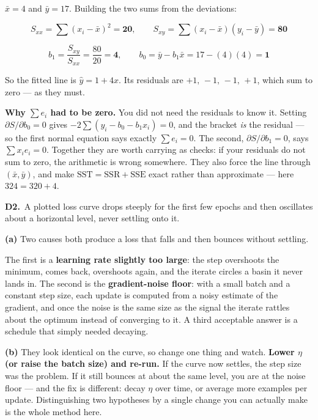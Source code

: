 \documentclass[10pt,a4paper]{article}
\newcommand{\sol}[1]{\textbf{#1}}
\begin{document}
\vspace{2pt}

$\bar x = 4$ and $\bar y = 17$. Building the two sums from the deviations:

\[ S_{xx} = \sum (x_i-\bar x)^2 = \sol{20}, \qquad S_{xy} = \sum (x_i-\bar x)(y_i-\bar y) = \sol{80} \]

\[ b_1 = \frac{S_{xy}}{S_{xx}} = \frac{80}{20} = \sol{4}, \qquad b_0 = \bar y - b_1\bar x = 17 - (4)(4) = \sol{1} \]

So the fitted line is $\hat y = 1 + 4 x$. Its residuals are $+1,\,-1,\,-1,\,+1$, which sum to zero --- as they must.

\vspace{2pt}

\textbf{Why $\sum e_i$ had to be zero.} You did not need the residuals to know it. Setting $\partial S/\partial b_0 = 0$ gives $-2\sum(y_i - b_0 - b_1x_i) = 0$, and the bracket \emph{is} the residual --- so the first normal equation says exactly $\sum e_i = 0$. The second, $\partial S/\partial b_1 = 0$, says $\sum x_ie_i = 0$. Together they are worth carrying as checks: if your residuals do not sum to zero, the arithmetic is wrong somewhere. They also force the line through $(\bar x, \bar y)$, and make $\mathrm{SST} = \mathrm{SSR} + \mathrm{SSE}$ exact rather than approximate --- here $324 = 320 + 4$.

\vspace{6pt}

\textbf{D2.}\ A plotted loss curve drops steeply for the first few epochs and then oscillates about a horizontal level, never settling onto it.

\vspace{2pt}

\textbf{(a)} Two causes both produce a loss that falls and then bounces without settling.\par\vspace{1mm}The first is a \textbf{learning rate slightly too large}: the step overshoots the minimum, comes back, overshoots again, and the iterate circles a basin it never lands in. The second is the \textbf{gradient-noise floor}: with a small batch and a constant step size, each update is computed from a noisy estimate of the gradient, and once the noise is the same size as the signal the iterate rattles about the optimum instead of converging to it. A third acceptable answer is a schedule that simply needed decaying.\par\vspace{1mm}\textbf{(b)} They look identical on the curve, so change one thing and watch. \textbf{Lower $\eta$ (or raise the batch size) and re-run.} If the curve now settles, the step size was the problem. If it still bounces at about the same level, you are at the noise floor --- and the fix is different: decay $\eta$ over time, or average more examples per update. Distinguishing two hypotheses by a single change you can actually make is the whole method here.
\end{document}
